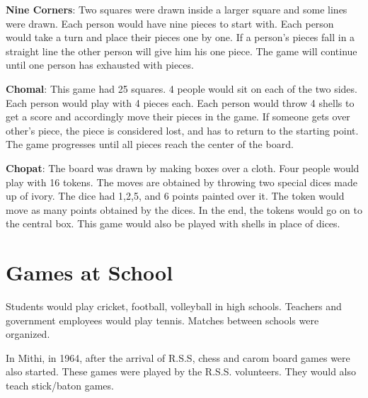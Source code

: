 \textbf{Nine Corners}: Two squares were drawn inside a larger square and some
lines were drawn. Each person would have nine pieces to start with.  Each
person would take a turn and place their pieces one by one. If a person's pieces
fall in a straight line the other person will give him his one piece. The game
will continue until one person has exhausted with pieces.

\textbf{Chomal}: This game had 25 squares. 4 people would sit on each of the
two sides. Each person would play with 4 pieces each. Each person would throw 4
shells to get a score and accordingly move their pieces in the game. If someone
gets over other's piece, the piece is considered lost, and has to return to the
starting point. The game progresses until all pieces reach the center of the
board.

\textbf{Chopat}: The board was drawn by making boxes over a cloth. Four people
would play with 16 tokens. The moves are obtained by throwing two special dices
made up of ivory. The dice had 1,2,5, and 6 points painted over it. The token
would move as many points obtained by the dices. In the end, the tokens would
go on to the central box. This game would also be played with shells in place
of dices.

\section{Games at School}

Students would play cricket, football, volleyball in high schools. Teachers
and government employees would play tennis. Matches between schools were
organized.

In Mithi, in 1964, after the arrival of R.S.S, chess and carom board games were
also started. These games were played by the R.S.S. volunteers. They would also
teach stick/baton games.

